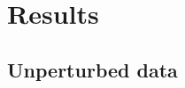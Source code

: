 \documentclass[conference]{IEEEtran}\usepackage[]{graphicx}\usepackage[]{color}
\begin{document}


\section{Results}

\subsection{Unperturbed data}








\appendix




 
\end{document}
